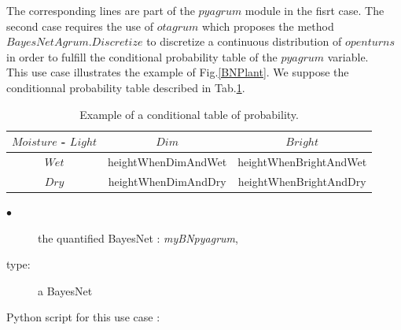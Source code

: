 The corresponding lines are  part of the $pyagrum$ module in the fisrt case.  The second case requires the use of $otagrum$ which proposes the method $BayesNetAgrum.Discretize$ to discretize a continuous distribution of $openturns$ in order to fulfill the conditional probability table of the $pyagrum$ variable.\\

This use case illustrates the example of Fig.\ref{BNPlant}. We suppose the conditionnal probability table described in Tab.\ref{condTP2}.\\

\begin{table}[H]
  \begin{center}
    \begin{tabular}{c|c|c}
      $Moisture$ - $Light$ & $Dim$ & $Bright$ \\
      \hline
      $Wet$ & heightWhenDimAndWet &  heightWhenBrightAndWet\\
      \hline
      $Dry$ & heightWhenDimAndDry &  heightWhenBrightAndDry
    \end{tabular}
    \caption{Example of a conditional table of probability.}
    \label{condTP2}
  \end{center}
\end{table}


{
  \begin{description}
  \item[$\bullet$] the quantified BayesNet : {\itshape myBNpyagrum},
  \item[type:] a BayesNet
  \end{description}
}

\espace 
Python  script for this use case :

